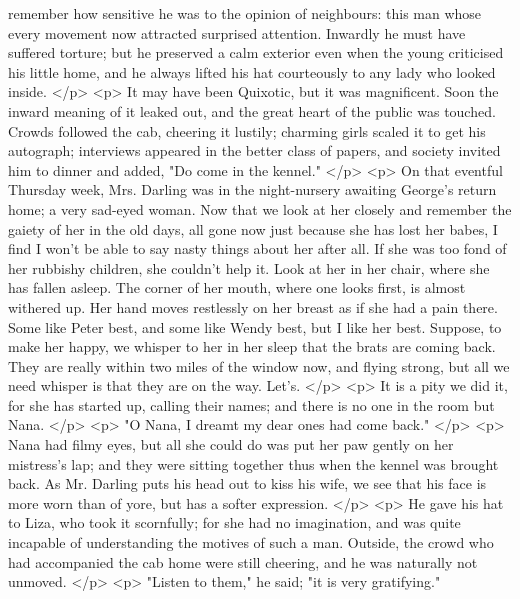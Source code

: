       remember how sensitive he was to the opinion of neighbours: this man whose
      every movement now attracted surprised attention. Inwardly he must have
      suffered torture; but he preserved a calm exterior even when the young
      criticised his little home, and he always lifted his hat courteously to
      any lady who looked inside.
    </p>
    <p>
      It may have been Quixotic, but it was magnificent. Soon the inward meaning
      of it leaked out, and the great heart of the public was touched. Crowds
      followed the cab, cheering it lustily; charming girls scaled it to get his
      autograph; interviews appeared in the better class of papers, and society
      invited him to dinner and added, "Do come in the kennel."
    </p>
    <p>
      On that eventful Thursday week, Mrs. Darling was in the night-nursery
      awaiting George's return home; a very sad-eyed woman. Now that we look at
      her closely and remember the gaiety of her in the old days, all gone now
      just because she has lost her babes, I find I won't be able to say nasty
      things about her after all. If she was too fond of her rubbishy children,
      she couldn't help it. Look at her in her chair, where she has fallen
      asleep. The corner of her mouth, where one looks first, is almost withered
      up. Her hand moves restlessly on her breast as if she had a pain there.
      Some like Peter best, and some like Wendy best, but I like her best.
      Suppose, to make her happy, we whisper to her in her sleep that the brats
      are coming back. They are really within two miles of the window now, and
      flying strong, but all we need whisper is that they are on the way. Let's.
    </p>
    <p>
      It is a pity we did it, for she has started up, calling their names; and
      there is no one in the room but Nana.
    </p>
    <p>
      "O Nana, I dreamt my dear ones had come back."
    </p>
    <p>
      Nana had filmy eyes, but all she could do was put her paw gently on her
      mistress's lap; and they were sitting together thus when the kennel was
      brought back. As Mr. Darling puts his head out to kiss his wife, we see
      that his face is more worn than of yore, but has a softer expression.
    </p>
    <p>
      He gave his hat to Liza, who took it scornfully; for she had no
      imagination, and was quite incapable of understanding the motives of such
      a man. Outside, the crowd who had accompanied the cab home were still
      cheering, and he was naturally not unmoved.
    </p>
    <p>
      "Listen to them," he said; "it is very gratifying."
